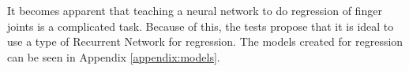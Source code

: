 \documentclass[../main.tex]{subfiles}
\begin{document}
It becomes apparent that teaching a neural network to do regression of finger joints is a complicated task.
Because of this, the tests propose that it is ideal to use a type of Recurrent Network for regression.
The models created for regression can be seen in Appendix \ref{appendix:models}.







\end{document}
